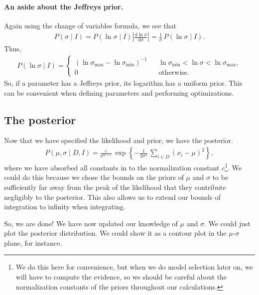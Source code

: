 \paragraph{An aside about the Jeffreys prior.} Again using the change
of variables formula, we see that
\begin{align}
P(\sigma \mid I) = P(\ln \sigma \mid I)\left|\frac{\mathrm{d}\ln \sigma}{\mathrm{d}\sigma}\right|
=  \frac{1}{\sigma}\, P(\ln \sigma \mid I).
\end{align}
Thus,
\begin{align}
P(\ln \sigma \mid I) = \left\{\begin{array}{ccl}
\left(\ln \sigma_\mathrm{max} - \ln \sigma_\mathrm{min}\right)^{-1} & & \ln \sigma_\mathrm{min} < \ln \sigma < \ln \sigma_\mathrm{max}, \\[1em]
0 & & \text{otherwise}.
\end{array}\right.
\end{align}
So, if a parameter has a Jeffreys prior, its logarithm has a uniform
prior.  This can be convenient when defining parameters and performing
optimizations.


\subsection{The posterior}
Now that we have specified the likelihood and prior, we have the
posterior.
\begin{align}
P(\mu, \sigma \mid D, I) = \frac{c}{\sigma^{n+1}}\,
\exp\left\{-\frac{1}{2\sigma^2}\,\sum_{i\in D} (x_i - \mu)^2\right\},
\end{align}
where we have absorbed all constants in to the normalization constant
$c$\footnote{We do this here for convenience, but when we do model selection later on, we will have to compute the evidence, so we should be careful about the normalization constants of the priors throughout our calculations.}.  We could do this because we chose the bounds on the priors of
$\mu$ and $\sigma$ to be sufficiently far away from the peak of the
likelihood that they contribute negligibly to the posterior.  This
also allows us to extend our bounds of integration to infinity when
integrating.

So, we are done!  We have now updated our knowledge of $\mu$ and
$\sigma$.  We could just plot the posterior distribution.  We could
show it as a contour plot in the $\mu$-$\sigma$ plane, for instance.

